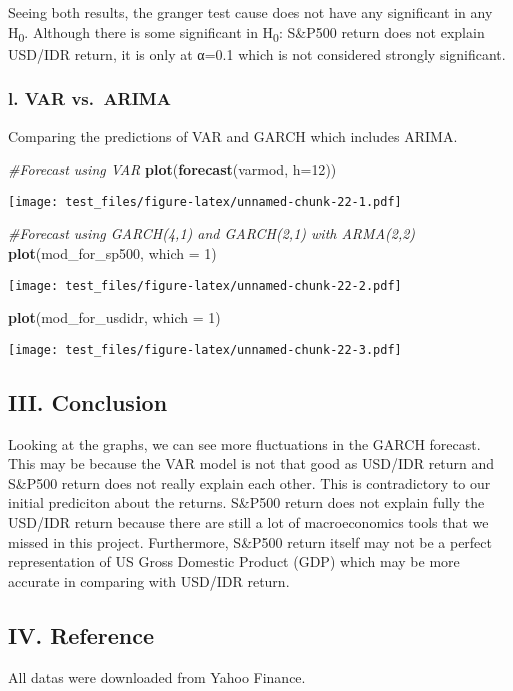 \documentclass[]{article}
\newenvironment{Shaded}{\begin{snugshade}}{\end{snugshade}}
\newcommand{\KeywordTok}[1]{\textcolor[rgb]{0.13,0.29,0.53}{\textbf{#1}}}
\newcommand{\DataTypeTok}[1]{\textcolor[rgb]{0.13,0.29,0.53}{#1}}
\newcommand{\DecValTok}[1]{\textcolor[rgb]{0.00,0.00,0.81}{#1}}
\newcommand{\CommentTok}[1]{\textcolor[rgb]{0.56,0.35,0.01}{\textit{#1}}}
\newcommand{\NormalTok}[1]{#1}
\begin{document}
Seeing both results, the granger test cause does not have any
significant in any H\textsubscript{0}. Although there is some
significant in H\textsubscript{0}: S\&P500 return does not explain
USD/IDR return, it is only at α=0.1 which is not considered strongly
significant.

\subsubsection{l. VAR vs.~ARIMA}\label{l.-var-vs.arima}

Comparing the predictions of VAR and GARCH which includes ARIMA.

\begin{Shaded}
\begin{Highlighting}[]
\CommentTok{#Forecast using VAR}
\KeywordTok{plot}\NormalTok{(}\KeywordTok{forecast}\NormalTok{(varmod, }\DataTypeTok{h=}\DecValTok{12}\NormalTok{))}
\end{Highlighting}
\end{Shaded}

\texttt{[image: test\_files/figure-latex/unnamed-chunk-22-1.pdf]}

\begin{Shaded}
\begin{Highlighting}[]
\CommentTok{#Forecast using GARCH(4,1) and GARCH(2,1) with ARMA(2,2)}
\KeywordTok{plot}\NormalTok{(mod_for_sp500, }\DataTypeTok{which =} \DecValTok{1}\NormalTok{)}
\end{Highlighting}
\end{Shaded}

\texttt{[image: test\_files/figure-latex/unnamed-chunk-22-2.pdf]}

\begin{Shaded}
\begin{Highlighting}[]
\KeywordTok{plot}\NormalTok{(mod_for_usdidr, }\DataTypeTok{which =} \DecValTok{1}\NormalTok{)}
\end{Highlighting}
\end{Shaded}

\texttt{[image: test\_files/figure-latex/unnamed-chunk-22-3.pdf]}

\subsection{III. Conclusion}\label{iii.-conclusion}

Looking at the graphs, we can see more fluctuations in the GARCH
forecast. This may be because the VAR model is not that good as USD/IDR
return and S\&P500 return does not really explain each other. This is
contradictory to our initial prediciton about the returns. S\&P500
return does not explain fully the USD/IDR return because there are still
a lot of macroeconomics tools that we missed in this project.
Furthermore, S\&P500 return itself may not be a perfect representation
of US Gross Domestic Product (GDP) which may be more accurate in
comparing with USD/IDR return.

\subsection{IV. Reference}\label{iv.-reference}

All datas were downloaded from Yahoo Finance.
\end{document}
